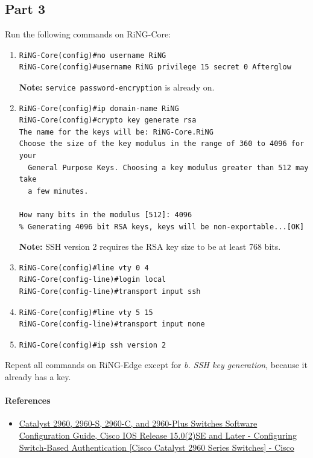 \documentclass[12pt, a4paper]{article}
\begin{document}
  \subsection*{Part 3}
   Run the following commands on RiNG-Core:
  \begin{enumerate}[label=\alph*.]
    \item
\begin{verbatim}
RiNG-Core(config)#no username RiNG
RiNG-Core(config)#username RiNG privilege 15 secret 0 Afterglow
\end{verbatim}
    \textbf{Note:} \verb|service password-encryption| is already on.

    \item
\begin{verbatim}
RiNG-Core(config)#ip domain-name RiNG
RiNG-Core(config)#crypto key generate rsa
The name for the keys will be: RiNG-Core.RiNG
Choose the size of the key modulus in the range of 360 to 4096 for your
  General Purpose Keys. Choosing a key modulus greater than 512 may take
  a few minutes.

How many bits in the modulus [512]: 4096
% Generating 4096 bit RSA keys, keys will be non-exportable...[OK]
\end{verbatim}
    \textbf{Note:} SSH version 2 requires the RSA key size to be at least 768
    bits.
    \item
\begin{verbatim}
RiNG-Core(config)#line vty 0 4
RiNG-Core(config-line)#login local
RiNG-Core(config-line)#transport input ssh
\end{verbatim}
    \item
\begin{verbatim}
RiNG-Core(config)#line vty 5 15
RiNG-Core(config-line)#transport input none
\end{verbatim}
    \item
\begin{verbatim}
RiNG-Core(config)#ip ssh version 2
\end{verbatim}
  \end{enumerate}
  Repeat all commands on RiNG-Edge except for \textit{b. SSH key generation},
  because it already has a key.

  \paragraph{References}
  \begin{itemize}
   \item \href{https://www.cisco.com/c/en/us/td/docs/switches/lan/catalyst2960/software/release/15-0_2_se/configuration/guide/scg2960/swauthen.html}{Catalyst 2960, 2960-S, 2960-C, and 2960-Plus Switches Software Configuration Guide, Cisco IOS Release 15.0(2)SE and Later - Configuring Switch-Based Authentication [Cisco Catalyst 2960 Series Switches] - Cisco}
  \end{itemize}
\end{document}
